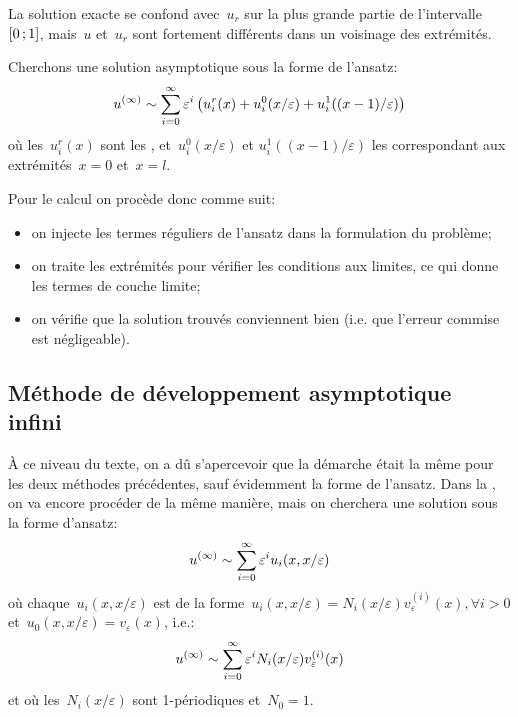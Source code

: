 La solution exacte se confond avec~$u_r$ sur la plus grande partie de l'intervalle~$\mathopen{[}0\,;1\mathclose{]}$,
mais~$u$ et~$u_r$ sont fortement différents dans un voisinage des extrémités.

\medskip
Cherchons une solution asymptotique sous la forme de l'ansatz:
\begin{equation}
u^{(\infty)} \sim \displaystyle\sum_{i=0}^\infty \varepsilon^i\left( u_i^r(x) + u_i^0(x/\varepsilon)
+u_i^1((x-1)/\varepsilon) \right)
\end{equation}
où les~$u_i^r(x)$ sont les , et~$u_i^0(x/\varepsilon)$ et
$u_i^1((x-1)/\varepsilon)$ les  correspondant aux
extrémités~$x=0$ et~$x=l$.

\medskip
Pour le calcul on procède donc comme suit:
\begin{itemize}
  \item on injecte les termes réguliers de l'ansatz dans la formulation du problème;
  \item on traite les extrémités pour vérifier les conditions aux limites, ce qui donne les termes de couche
	limite;
  \item on vérifie que la solution trouvés conviennent bien (i.e. que l'erreur commise est négligeable).
\end{itemize}


\medskip
\subsection{Méthode de développement asymptotique infini}

À ce niveau du texte, on a dû s'apercevoir que la démarche était la même pour les deux méthodes précédentes, sauf évidemment la forme de l'ansatz.
Dans la , on va encore procéder de la même manière, mais on cherchera une solution sous la forme d'ansatz:
\begin{equation}
u^{(\infty)} \sim \displaystyle\sum_{i=0}^\infty \varepsilon^i u_i(x,x/\varepsilon)
\end{equation}
où chaque~$u_i(x,x/\varepsilon)$ est de la forme~$u_i(x,x/\varepsilon)=N_i(x/\varepsilon)v_\varepsilon^{(i)}(x),
\forall i>0$ et~$u_0(x,x/\varepsilon)=v_\varepsilon(x)$, i.e.:
\begin{equation}
u^{(\infty)} \sim \displaystyle\sum_{i=0}^\infty \varepsilon^i N_i(x/\varepsilon)v_\varepsilon^{(i)}(x)
\end{equation}
et où les~$N_i(x/\varepsilon)$ sont 1-périodiques et~$N_0=1$.

